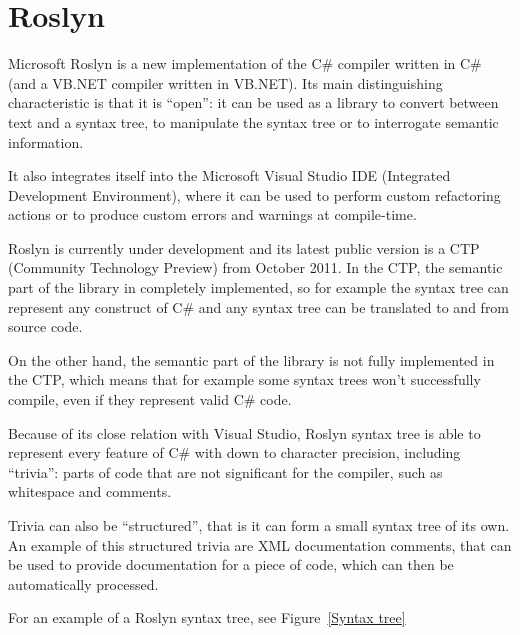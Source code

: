 \section{Roslyn}

Microsoft Roslyn is a new implementation of the C\# compiler written in C\#
(and a VB.NET compiler written in VB.NET).
Its main distinguishing characteristic is that it is “open”:
it can be used as a library to convert between text and a syntax tree,
to manipulate the syntax tree or to interrogate semantic information.

It also integrates itself into the Microsoft Visual Studio IDE
(Integrated Development Environment), where it can be used to perform
custom refactoring actions or to produce custom errors and warnings at compile-time.

Roslyn is currently under development and its latest public version is a CTP
(Community Technology Preview) from October 2011.
In the CTP, the semantic part of the library in completely implemented,
so for example the syntax tree can represent any construct of C\#
and any syntax tree can be translated to and from source code.

On the other hand, the semantic part of the library is not fully implemented in the CTP,
which means that for example some syntax trees won't successfully compile,
even if they represent valid C\# code.

Because of its close relation with Visual Studio,
Roslyn syntax tree is able to represent every feature of C\# with down to character precision,
including “trivia”: parts of code that are not significant for the compiler,
such as whitespace and comments.

Trivia can also be “structured”, that is it can form a small syntax tree of its own.
An example of this structured trivia are XML documentation comments,
that can be used to provide documentation for a piece of code,
which can then be automatically processed.

For an example of a Roslyn syntax tree, see Figure~\ref{Syntax tree}

